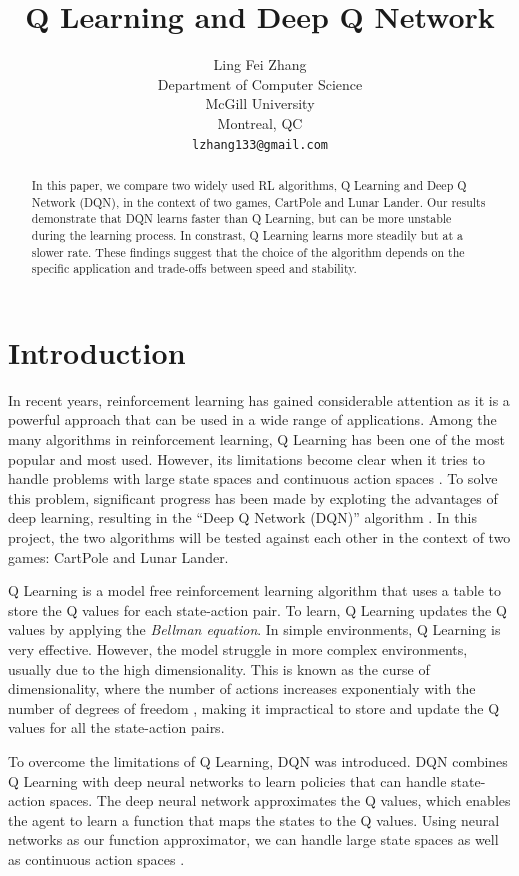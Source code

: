 \documentclass{article}
\title{Q Learning and Deep Q Network}
\author{%
      Ling Fei Zhang\\
      Department of Computer Science\\ McGill University\\ Montreal, QC \\
      \texttt{lzhang133@gmail.com} \\
}
\begin{document}
\maketitle

\begin{abstract}
      In this paper, we compare two widely used RL algorithms, Q Learning and Deep Q Network (DQN), in the context of two games, CartPole and Lunar Lander. Our results demonstrate that DQN learns faster than Q Learning, but can be more unstable during the learning process. In constrast, Q Learning learns more steadily but at a slower rate. These findings suggest that the choice of the algorithm depends on the specific application and trade-offs between speed and stability.
\end{abstract}

\section{Introduction}

In recent years, reinforcement learning has gained considerable attention as it
is a powerful approach that can be used in a wide range of applications. Among
the many algorithms in reinforcement learning, Q Learning has been one of the
most popular and most used. However, its limitations become clear when it tries
to handle problems with large state spaces and continuous action spaces
\cite{qlearning}. To solve this problem, significant progress has been made by
exploting the advantages of deep learning, resulting in the ``Deep Q Network
(DQN)'' algorithm \cite{DBLP:journals/corr/MnihKSGAWR13}. In this project, the
two algorithms will be tested against each other in the context of two games:
CartPole and Lunar Lander.

Q Learning is a model free reinforcement learning algorithm that uses a table
to store the Q values for each state-action pair. To learn, Q Learning updates
the Q values by applying the \emph{Bellman equation}. In simple environments, Q
Learning is very effective. However, the model struggle in more complex
environments, usually due to the high dimensionality. This is known as the
curse of dimensionality, where the number of actions increases exponentialy
with the number of degrees of freedom \cite{soft_update}, making it impractical
to store and update the Q values for all the state-action pairs.

To overcome the limitations of Q Learning, DQN was introduced. DQN combines Q
Learning with deep neural networks to learn policies that can handle
state-action spaces. The deep neural network approximates the Q values, which
enables the agent to learn a function that maps the states to the Q values.
Using neural networks as our function approximator, we can handle large state
spaces as well as continuous action spaces
\cite{function_approximation,temporal_diff}.
\end{document}
